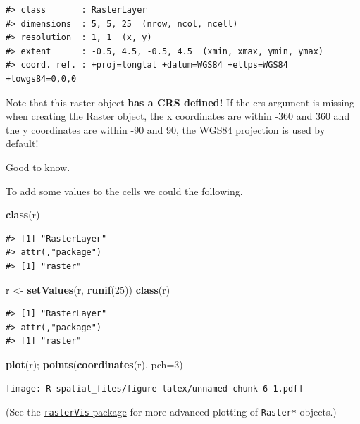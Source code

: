\documentclass[]{book}
\newenvironment{Shaded}{\begin{snugshade}}{\end{snugshade}}
\newcommand{\KeywordTok}[1]{\textcolor[rgb]{0.13,0.29,0.53}{\textbf{#1}}}
\newcommand{\DataTypeTok}[1]{\textcolor[rgb]{0.13,0.29,0.53}{#1}}
\newcommand{\DecValTok}[1]{\textcolor[rgb]{0.00,0.00,0.81}{#1}}
\newcommand{\StringTok}[1]{\textcolor[rgb]{0.31,0.60,0.02}{#1}}
\newcommand{\NormalTok}[1]{#1}
\theoremstyle{definition}
\theoremstyle{definition}
\theoremstyle{definition}
\theoremstyle{remark}
\begin{document}
\begin{verbatim}
#> class       : RasterLayer 
#> dimensions  : 5, 5, 25  (nrow, ncol, ncell)
#> resolution  : 1, 1  (x, y)
#> extent      : -0.5, 4.5, -0.5, 4.5  (xmin, xmax, ymin, ymax)
#> coord. ref. : +proj=longlat +datum=WGS84 +ellps=WGS84 +towgs84=0,0,0
\end{verbatim}

Note that this raster object \textbf{has a CRS defined!} If the crs
argument is missing when creating the Raster object, the x coordinates
are within -360 and 360 and the y coordinates are within -90 and 90, the
WGS84 projection is used by default!

Good to know.

To add some values to the cells we could the following.

\begin{Shaded}
\begin{Highlighting}[]
\KeywordTok{class}\NormalTok{(r)}
\end{Highlighting}
\end{Shaded}

\begin{verbatim}
#> [1] "RasterLayer"
#> attr(,"package")
#> [1] "raster"
\end{verbatim}

\begin{Shaded}
\begin{Highlighting}[]
\NormalTok{r <-}\StringTok{ }\KeywordTok{setValues}\NormalTok{(r, }\KeywordTok{runif}\NormalTok{(}\DecValTok{25}\NormalTok{))}
\KeywordTok{class}\NormalTok{(r)}
\end{Highlighting}
\end{Shaded}

\begin{verbatim}
#> [1] "RasterLayer"
#> attr(,"package")
#> [1] "raster"
\end{verbatim}

\begin{Shaded}
\begin{Highlighting}[]
\KeywordTok{plot}\NormalTok{(r); }\KeywordTok{points}\NormalTok{(}\KeywordTok{coordinates}\NormalTok{(r), }\DataTypeTok{pch=}\DecValTok{3}\NormalTok{)}
\end{Highlighting}
\end{Shaded}

\texttt{[image: R-spatial\_files/figure-latex/unnamed-chunk-6-1.pdf]}

(See the
\href{https://cran.r-project.org/web/packages/rasterVis/index.html}{\texttt{rasterVis}
package} for more advanced plotting of \texttt{Raster*} objects.)
\end{document}
